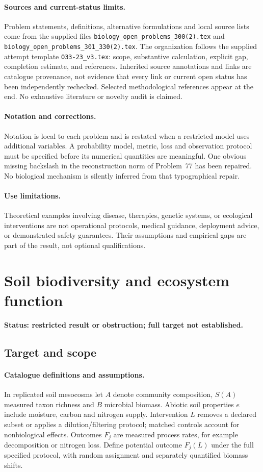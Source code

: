 \documentclass[11pt]{article}
\begin{document}
\paragraph{Sources and current-status limits.}
Problem statements, definitions, alternative formulations and local source lists
come from the supplied files
\texttt{biology\_open\_problems\_300(2).tex} and
\texttt{biology\_open\_problems\_301\_330(2).tex}.
The organization follows the supplied attempt template
\texttt{O33-23\_v3.tex}: scope, substantive calculation, explicit gap,
completion estimate, and references. Inherited source annotations and links are
catalogue provenance, not evidence that every link or current open status has
been independently rechecked. Selected methodological references appear at the
end. No exhaustive literature or novelty audit is claimed.

\paragraph{Notation and corrections.}
Notation is local to each problem and is restated when a restricted model uses
additional variables. A probability model, metric, loss and observation protocol
must be specified before its numerical quantities are meaningful. One obvious
missing backslash in the reconstruction norm of Problem~77 has been repaired.
No biological mechanism is silently inferred from that typographical repair.

\paragraph{Use limitations.}
Theoretical examples involving disease, therapies, genetic systems, or ecological
interventions are not operational protocols, medical guidance, deployment advice,
or demonstrated safety guarantees. Their assumptions and empirical gaps are part
of the result, not optional qualifications.


\section*{Soil biodiversity and ecosystem function}
\label{prob:193}
\noindent\textbf{Status: restricted result or obstruction; full target not established.}
\subsection{Target and scope}
\paragraph{Catalogue definitions and assumptions.}
In replicated soil mesocosms let $A$ denote community composition, $S(A)$ measured taxon richness and $B$ microbial biomass. Abiotic soil properties $e$ include moisture, carbon and nitrogen supply. Intervention $L$ removes a declared subset or applies a dilution/filtering protocol; matched controls account for nonbiological effects. Outcomes $F_j$ are measured process rates, for example decomposition or nitrogen loss. Define potential outcome $F_j(L)$ under the full specified protocol, with random assignment and separately quantified biomass shifts.
\end{document}
